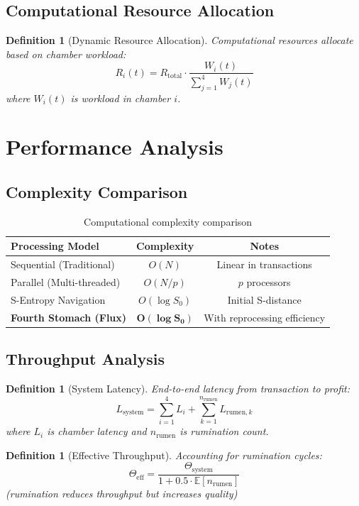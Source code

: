 \documentclass[12pt]{article}
\newtheorem{definition}[theorem]{Definition}
\begin{document}
\subsection{Computational Resource Allocation}

\begin{definition}[Dynamic Resource Allocation]
Computational resources allocate based on chamber workload:
$$
R_i(t) = R_{\text{total}} \cdot \frac{W_i(t)}{\sum_{j=1}^{4} W_j(t)}
$$
where $W_i(t)$ is workload in chamber $i$.
\end{definition}

\section{Performance Analysis}

\subsection{Complexity Comparison}

\begin{table}[h]
\centering
\begin{tabular}{|l|c|c|}
\hline
Processing Model & Complexity & Notes \\
\hline
Sequential (Traditional) & $O(N)$ & Linear in transactions \\
Parallel (Multi-threaded) & $O(N/p)$ & $p$ processors \\
S-Entropy Navigation & $O(\log S_0)$ & Initial S-distance \\
\textbf{Fourth Stomach (Flux)} & $\mathbf{O(\log S_0)}$ & With reprocessing efficiency \\
\hline
\end{tabular}
\caption{Computational complexity comparison}
\end{table}

\subsection{Throughput Analysis}

\begin{definition}[System Latency]
End-to-end latency from transaction to profit:
$$
L_{\text{system}} = \sum_{i=1}^{4} L_i + \sum_{k=1}^{n_{\text{rumen}}} L_{\text{rumen},k}
$$
where $L_i$ is chamber latency and $n_{\text{rumen}}$ is rumination count.
\end{definition}

\begin{definition}[Effective Throughput]
Accounting for rumination cycles:
$$
\Theta_{\text{eff}} = \frac{\Theta_{\text{system}}}{1 + 0.5 \cdot \mathbb{E}[n_{\text{rumen}}]}
$$
(rumination reduces throughput but increases quality)
\end{definition}
\end{document}
